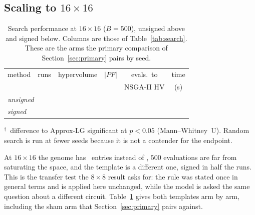 \documentclass[acmsmall,review,anonymous]{acmart}
\begin{document}
\subsection{\texorpdfstring{Scaling to $16\times16$}{Scaling to 16x16}}
\label{sec:hv16}

\begin{table}[t]
\caption{Search performance at $16\times16$ ($B=500$), unsigned above and
signed below.  Columns are those of Table~\ref{tab:search}.  These are the arms
the primary comparison of Section~\ref{sec:primary} pairs by seed.}
\label{tab:search16}
\centering\footnotesize
\setlength{\tabcolsep}{3pt}
\begin{tabular}{lccccc}
\toprule
method & runs & hypervolume & $|PF|$ & evals.\ to & time\\
       &      &             &        & NSGA-II HV & (s)\\
\midrule
\multicolumn{6}{l}{\emph{unsigned}}\\

\midrule
\multicolumn{6}{l}{\emph{signed}}\\

\bottomrule
\end{tabular}

\smallskip
{\footnotesize $^{\dagger}$~difference to Approx-LG significant at $p<0.05$
(Mann--Whitney~U).  Random search is run at fewer seeds because it is not a
contender for the endpoint.}
\end{table}

At $16\times16$ the genome has \GenesSixteen\ entries instead of \GenesEight,
$500$ evaluations are far from saturating the space, and the template is a
different one, signed in half the runs.  This is the transfer test the
$8\times8$ result asks for: the rule was stated once in general terms and is
applied here unchanged, while the model is asked the same question about a
different circuit.  Table~\ref{tab:search16} gives both templates arm by arm,
including the sham arm that Section~\ref{sec:primary} pairs against.
\SixteenText
\end{document}
